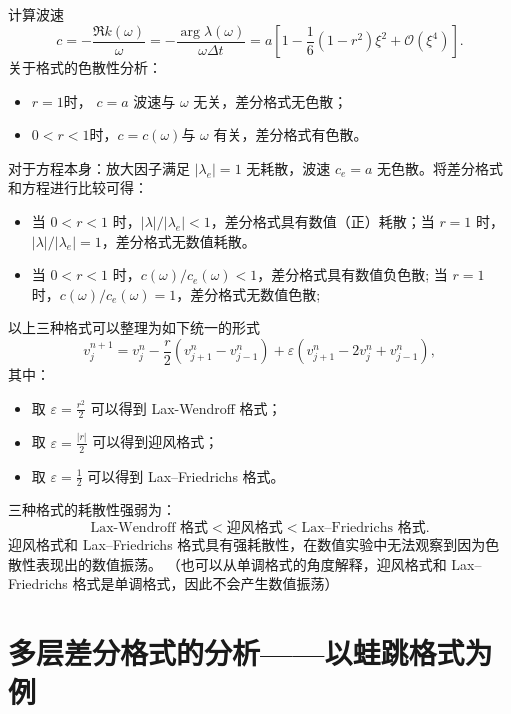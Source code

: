 \begin{solution*}
    计算波速
    \[
        c = -\frac{\Re k(\omega)}{\omega} = - \frac{\arg \lambda(\omega)}{ \omega\Delta t} = a  \left[
            1 - \frac16 (1-r^2)\xi^2 +  \mathcal{O}(\xi^4)
            \right].
    \]
    关于格式的色散性分析：
    \begin{itemize}
        \item $r=1$时， $c = a$ 波速与 $\omega$ 无关，差分格式无色散；
        \item $0<r<1$时，$c = c(\omega)$与 $\omega$ 有关，差分格式有色散。
    \end{itemize}
    对于方程本身：放大因子满足 $|\lambda_e| = 1$ 无耗散，波速 $c_e = a$ 无色散。将差分格式和方程进行比较可得：
    \begin{itemize}
        \item 当 $0 < r < 1$ 时，$|\lambda| / |\lambda_e|  < 1$，差分格式具有数值（正）耗散；当 $r=1$ 时，$|\lambda| / |\lambda_e|  = 1$，差分格式无数值耗散。
        \item 当 $0 < r < 1$ 时，$c(\omega) / c_e(\omega) < 1$，差分格式具有数值负色散; 当 $r=1$ 时，$c(\omega) / c_e(\omega) = 1$，差分格式无数值色散;
    \end{itemize}
\end{solution*}

\begin{remark}
    以上三种格式可以整理为如下统一的形式
    \[
        v_j^{n+1} = v_j^n - \frac{r}2 (v_{j+1}^n - v_{j-1}^{n}) + \varepsilon (v_{j+1}^n - 2 v_j^n + v_{j-1}^{n}),
    \]
    其中：
    \begin{itemize}
        \item 取 $\varepsilon = \frac{r^2}2$ 可以得到 Lax-Wendroff 格式；
        \item 取 $\varepsilon = \frac{|r|}2$ 可以得到迎风格式；
        \item 取 $\varepsilon = \frac12$ 可以得到 Lax–Friedrichs 格式。
    \end{itemize}
    三种格式的耗散性强弱为：
    \[
        \text{Lax-Wendroff 格式} < \text{迎风格式} < \text{Lax–Friedrichs 格式}.
    \]
    迎风格式和 Lax–Friedrichs 格式具有强耗散性，在数值实验中无法观察到因为色散性表现出的数值振荡。
    （也可以从单调格式的角度解释，迎风格式和 Lax–Friedrichs 格式是单调格式，因此不会产生数值振荡）
\end{remark}


\section{多层差分格式的分析——以蛙跳格式为例}\label{sec:multi-layer-format}

